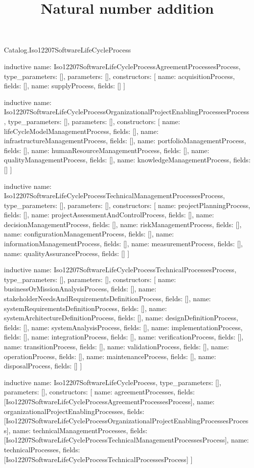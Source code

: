 \begin{lexlean}{Catalog.Iso12207SoftwareLifeCycleProcess}
\title{Natural number addition}
\begin{semanticmodule}
inductive{
  name: Iso12207SoftwareLifeCycleProcessAgreementProcessesProcess,
  type_parameters: [],
  parameters: [],
  constructors: [
    {name: acquisitionProcess, fields: []},
    {name: supplyProcess, fields: []}
  ]
}

inductive{
  name: Iso12207SoftwareLifeCycleProcessOrganizationalProjectEnablingProcessesProcess,
  type_parameters: [],
  parameters: [],
  constructors: [
    {name: lifeCycleModelManagementProcess, fields: []},
    {name: infrastructureManagementProcess, fields: []},
    {name: portfolioManagementProcess, fields: []},
    {name: humanResourceManagementProcess, fields: []},
    {name: qualityManagementProcess, fields: []},
    {name: knowledgeManagementProcess, fields: []}
  ]
}

inductive{
  name: Iso12207SoftwareLifeCycleProcessTechnicalManagementProcessesProcess,
  type_parameters: [],
  parameters: [],
  constructors: [
    {name: projectPlanningProcess, fields: []},
    {name: projectAssessmentAndControlProcess, fields: []},
    {name: decisionManagementProcess, fields: []},
    {name: riskManagementProcess, fields: []},
    {name: configurationManagementProcess, fields: []},
    {name: informationManagementProcess, fields: []},
    {name: measurementProcess, fields: []},
    {name: qualityAssuranceProcess, fields: []}
  ]
}

inductive{
  name: Iso12207SoftwareLifeCycleProcessTechnicalProcessesProcess,
  type_parameters: [],
  parameters: [],
  constructors: [
    {name: businessOrMissionAnalysisProcess, fields: []},
    {name: stakeholderNeedsAndRequirementsDefinitionProcess, fields: []},
    {name: systemRequirementsDefinitionProcess, fields: []},
    {name: systemArchitectureDefinitionProcess, fields: []},
    {name: designDefinitionProcess, fields: []},
    {name: systemAnalysisProcess, fields: []},
    {name: implementationProcess, fields: []},
    {name: integrationProcess, fields: []},
    {name: verificationProcess, fields: []},
    {name: transitionProcess, fields: []},
    {name: validationProcess, fields: []},
    {name: operationProcess, fields: []},
    {name: maintenanceProcess, fields: []},
    {name: disposalProcess, fields: []}
  ]
}

inductive{
  name: Iso12207SoftwareLifeCycleProcess,
  type_parameters: [],
  parameters: [],
  constructors: [
    {name: agreementProcesses, fields: [Iso12207SoftwareLifeCycleProcessAgreementProcessesProcess]},
    {name: organizationalProjectEnablingProcesses, fields: [Iso12207SoftwareLifeCycleProcessOrganizationalProjectEnablingProcessesProcess]},
    {name: technicalManagementProcesses, fields: [Iso12207SoftwareLifeCycleProcessTechnicalManagementProcessesProcess]},
    {name: technicalProcesses, fields: [Iso12207SoftwareLifeCycleProcessTechnicalProcessesProcess]}
  ]
}
\end{semanticmodule}
\end{lexlean}
